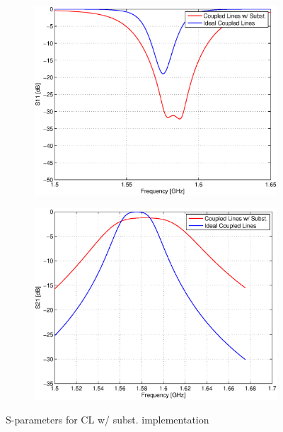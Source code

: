 \documentclass[a4paper]{article}        %
\begin{document}
  \begin{figure}[H]
  		\centering
  	\begin{subfigure}{.7\textwidth}
  	\includegraphics[width=\textwidth]{fig/Filter/2nd_order/plots/S11_subst_CL.eps}
  	\end{subfigure}
  	\begin{subfigure}{.7\textwidth}
  	\includegraphics[width=\textwidth]{fig/Filter/2nd_order/plots/S21_subst_CL.eps}
  	\end{subfigure}
  	\caption{S-parameters for CL w/ subst. implementation}
  	\label{fig:filter_spar_subst_CL}
  \end{figure}
\end{document}
